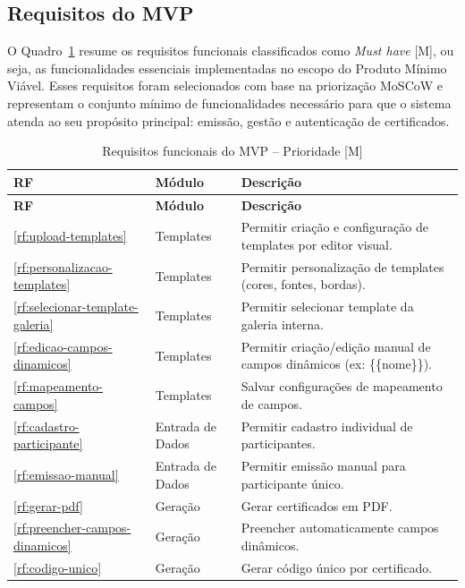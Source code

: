 \subsection{Requisitos do MVP}

O Quadro~\ref{qua:mvp} resume os requisitos funcionais classificados como \textit{Must have} [M], ou seja, as funcionalidades essenciais implementadas no escopo do Produto Mínimo Viável. Esses requisitos foram selecionados com base na priorização MoSCoW e representam o conjunto mínimo de funcionalidades necessário para que o sistema atenda ao seu propósito principal: emissão, gestão e autenticação de certificados.

\small
\begingroup
\renewcommand{\tablename}{Quadro}
\begin{longtable}{p{1.2cm} p{3.5cm} p{10.5cm}}
\caption{Requisitos funcionais do MVP -- Prioridade [M]}
\label{qua:mvp}\\
\toprule
\textbf{RF} & \textbf{Módulo} & \textbf{Descrição} \\
\midrule
\endfirsthead
\toprule
\textbf{RF} & \textbf{Módulo} & \textbf{Descrição} \\
\midrule
\endhead
\bottomrule
\endfoot
\bottomrule
\endlastfoot
\ref{rf:upload-templates} & Templates & Permitir criação e configuração de templates por editor visual. \\
\ref{rf:personalizacao-templates} & Templates & Permitir personalização de templates (cores, fontes, bordas). \\
\ref{rf:selecionar-template-galeria} & Templates & Permitir selecionar template da galeria interna. \\
\ref{rf:edicao-campos-dinamicos} & Templates & Permitir criação/edição manual de campos dinâmicos (ex: \{\{nome\}\}). \\
\ref{rf:mapeamento-campos} & Templates & Salvar configurações de mapeamento de campos. \\
\midrule
\ref{rf:cadastro-participante} & Entrada de Dados & Permitir cadastro individual de participantes. \\
\ref{rf:emissao-manual} & Entrada de Dados & Permitir emissão manual para participante único. \\
\midrule
\ref{rf:gerar-pdf} & Geração & Gerar certificados em PDF. \\
\ref{rf:preencher-campos-dinamicos} & Geração & Preencher automaticamente campos dinâmicos. \\
\ref{rf:codigo-unico} & Geração & Gerar código único por certificado. \\

\end{longtable}
